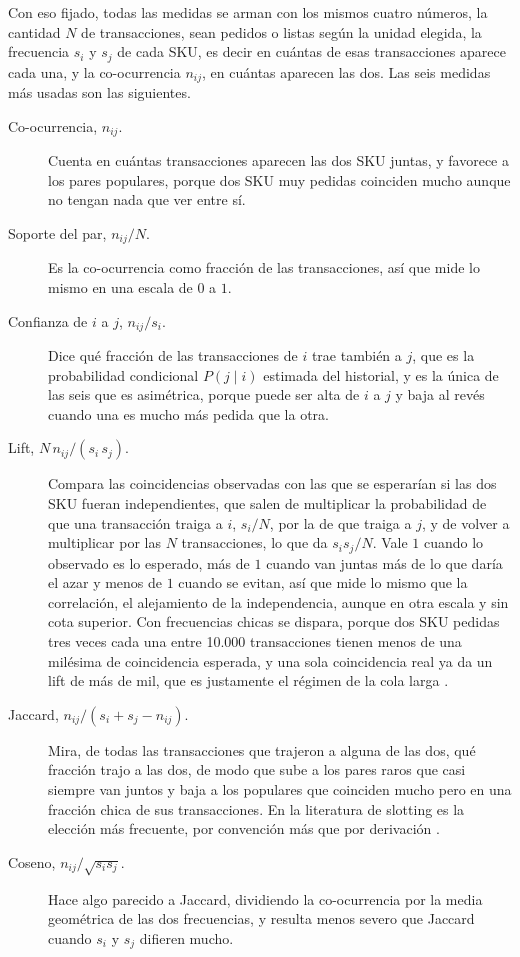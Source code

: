 Con eso fijado, todas las medidas se arman con los mismos cuatro números, la cantidad $N$ de transacciones, sean pedidos o listas según la unidad elegida, la frecuencia $s_i$ y $s_j$ de cada SKU, es decir en cuántas de esas transacciones aparece cada una, y la co-ocurrencia $n_{ij}$, en cuántas aparecen las dos.
Las seis medidas más usadas son las siguientes.
\begin{description}
    \item[Co-ocurrencia, $n_{ij}$.] Cuenta en cuántas transacciones aparecen las dos SKU juntas, y favorece a los pares populares, porque dos SKU muy pedidas coinciden mucho aunque no tengan nada que ver entre sí.
    \item[Soporte del par, $n_{ij}/N$.] Es la co-ocurrencia como fracción de las transacciones, así que mide lo mismo en una escala de $0$ a $1$.
    \item[Confianza de $i$ a $j$, $n_{ij}/s_i$.] Dice qué fracción de las transacciones de $i$ trae también a $j$, que es la probabilidad condicional $P(j \mid i)$ estimada del historial, y es la única de las seis que es asimétrica, porque puede ser alta de $i$ a $j$ y baja al revés cuando una es mucho más pedida que la otra.
    \item[Lift, $N\,n_{ij}/(s_i\,s_j)$.] Compara las coincidencias observadas con las que se esperarían si las dos SKU fueran independientes, que salen de multiplicar la probabilidad de que una transacción traiga a $i$, $s_i/N$, por la de que traiga a $j$, y de volver a multiplicar por las $N$ transacciones, lo que da $s_i s_j / N$. Vale $1$ cuando lo observado es lo esperado, más de $1$ cuando van juntas más de lo que daría el azar y menos de $1$ cuando se evitan, así que mide lo mismo que la correlación, el alejamiento de la independencia, aunque en otra escala y sin cota superior. Con frecuencias chicas se dispara, porque dos SKU pedidas tres veces cada una entre 10.000 transacciones tienen menos de una milésima de coincidencia esperada, y una sola coincidencia real ya da un lift de más de mil, que es justamente el régimen de la cola larga \citep{li2015dynamic}.
    \item[Jaccard, $n_{ij}/(s_i + s_j - n_{ij})$.] Mira, de todas las transacciones que trajeron a alguna de las dos, qué fracción trajo a las dos, de modo que sube a los pares raros que casi siempre van juntos y baja a los populares que coinciden mucho pero en una fracción chica de sus transacciones. En la literatura de slotting es la elección más frecuente, por convención más que por derivación \citep{zhang2016correlated}.
    \item[Coseno, $n_{ij}/\sqrt{s_i s_j}$.] Hace algo parecido a Jaccard, dividiendo la co-ocurrencia por la media geométrica de las dos frecuencias, y resulta menos severo que Jaccard cuando $s_i$ y $s_j$ difieren mucho.
\end{description}

